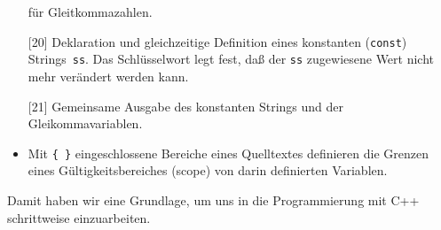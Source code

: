 \begin{itemize}
      für Gleitkommazahlen.
    \item[{[20]}] Deklaration und gleichzeitige Definition eines konstanten (\texttt{const}) Strings~\texttt{ss}. Das Schlüsselwort legt fest, daß der \texttt{ss} zugewiesene Wert nicht mehr
      verändert werden kann.
    \item[{[21]}] Gemeinsame Ausgabe des konstanten Strings und der Gleikommavariablen.
    \item Mit \verb|{ }|  eingeschlossene Bereiche eines Quelltextes
	  definieren die Grenzen eines Gültigkeitsbereiches (scope)
	  von darin definierten Variablen.
\end{itemize}

Damit haben wir eine Grundlage, um uns in die Programmierung mit C++
schrittweise einzuarbeiten.
